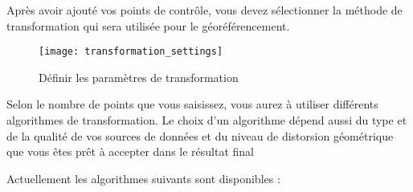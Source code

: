Après avoir ajouté vos points de contrôle, vous devez sélectionner la méthode de transformation qui sera utilisée pour le géoréférencement. %

\begin{figure}[ht]
\centering
  \texttt{[image: transformation\_settings]}
  \caption{Définir les paramètres de transformation \nixcaption}\label{fig:georef_transform}
\end{figure}



Selon le nombre de points que vous saisissez, vous aurez à utiliser différents algorithmes de transformation. Le choix d'un algorithme dépend aussi du type et de la qualité de vos sources de données et du niveau de distorsion géométrique que vous êtes prêt à accepter dans le résultat final

Actuellement les algorithmes suivants sont disponibles :

